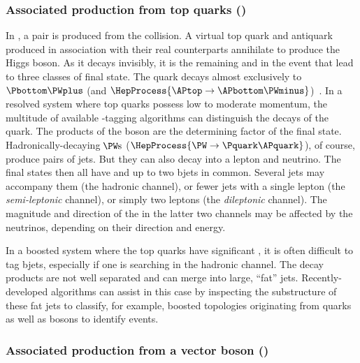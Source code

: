 

\subsubsection{Associated production from top quarks (\texorpdfstring{\ttH}{ttH})}
\label{subsubsec:theory_hinv_ttH_mode}

In \ttH, a \ttbar pair is produced from the collision. A virtual top quark \Ptop and antiquark \APtop produced in association with their real counterparts annihilate to produce the Higgs boson. As it decays invisibly, it is the remaining \Ptop and \APtop in the event that lead to three classes of final state. The \Ptop quark decays almost exclusively to $\Pbottom\PWplus$ (and $\HepProcess{\APtop \to \APbottom\PWminus}$)~\cite{PhysRevD.98.030001}. In a resolved system where top quarks possess low to moderate momentum, the multitude of available \Pbottom-tagging algorithms can distinguish the decays of the \Pbottom quark. The products of the \PW boson are the determining factor of the final state. Hadronically-decaying $\mkern-2mu\PW\text{s}$ ($\HepProcess{\PW \to \Pquark\APquark}$), of course, produce pairs of \glspl{jet}. But they can also decay into a lepton and neutrino. The final states then all have \ptvecmiss and up to two \glspl{bjet} in common. Several \glspl{jet} may accompany them (the hadronic channel), or fewer \glspl{jet} with a single lepton (the \emph{semi-leptonic} channel), or simply two leptons (the \emph{dileptonic} channel). The magnitude and direction of the \ptvecmiss in the latter two channels may be affected by the neutrinos, depending on their direction and energy.

In a boosted system where the top quarks have significant \pt, it is often difficult to tag \glspl{bjet}, especially if one is searching in the hadronic channel. The decay products are not well separated and can merge into large, ``fat'' \glspl{jet}. Recently-developed algorithms can assist in this case by inspecting the substructure of these fat \glspl{jet} to classify, for example, boosted topologies originating from \Ptop quarks as well as \PVec bosons to identify \ttH events.




\subsubsection{Associated production from a vector boson (\texorpdfstring{\VH}{VH})}
\label{subsubsec:theory_hinv_VH_mode}

